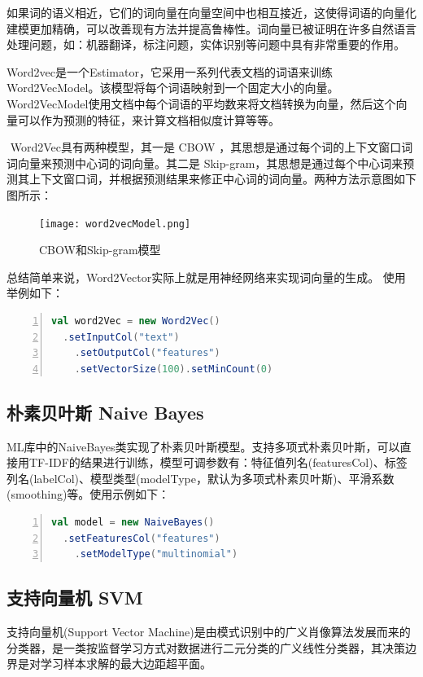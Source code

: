 \documentclass[lang=cn,11pt]{elegantpaper}
\begin{document}
如果词的语义相近，它们的词向量在向量空间中也相互接近，这使得词语的向量化建模更加精确，可以改善现有方法并提高鲁棒性。词向量已被证明在许多自然语言处理问题，如：机器翻译，标注问题，实体识别等问题中具有非常重要的作用。

​ Word2vec是一个Estimator，它采用一系列代表文档的词语来训练Word2VecModel。该模型将每个词语映射到一个固定大小的向量。Word2VecModel使用文档中每个词语的平均数来将文档转换为向量，然后这个向量可以作为预测的特征，来计算文档相似度计算等等。

​ Word2Vec具有两种模型，其一是 CBOW ，其思想是通过每个词的上下文窗口词词向量来预测中心词的词向量。其二是 Skip-gram，其思想是通过每个中心词来预测其上下文窗口词，并根据预测结果来修正中心词的词向量。两种方法示意图如下图所示：
\begin{figure}[H]
	\centering
	\texttt{[image: word2vecModel.png]}
	\caption{CBOW和Skip-gram模型 \label{fig:Word2VecModel}}
\end{figure}
总结简单来说，Word2Vector实际上就是用神经网络来实现词向量的生成。
使用举例如下：
\begin{lstlisting}[language={Scala},numbers=left,numberstyle=\tiny,%frame=shadowbox,  
  rulesepcolor=\color{red!20!green!20!blue!20},  
  keywordstyle=\color{blue!70!black},  
  commentstyle=\color{blue!90!},  
  basicstyle=\ttfamily]  
val word2Vec = new Word2Vec()
  .setInputCol("text")
	.setOutputCol("features")
	.setVectorSize(100).setMinCount(0)
\end{lstlisting}\par

\subsection{朴素贝叶斯 Naive Bayes}
ML库中的NaiveBayes类实现了朴素贝叶斯模型。支持多项式朴素贝叶斯，可以直接用TF-IDF的结果进行训练，模型可调参数有：特征值列名(featuresCol)、标签列名(labelCol)、模型类型(modelType，默认为多项式朴素贝叶斯)、平滑系数(smoothing)等。使用示例如下：
\begin{lstlisting}[language={Scala},numbers=left,numberstyle=\tiny,%frame=shadowbox,  
  rulesepcolor=\color{red!20!green!20!blue!20},  
  keywordstyle=\color{blue!70!black},  
  commentstyle=\color{blue!90!},  
  basicstyle=\ttfamily]  
val model = new NaiveBayes()
  .setFeaturesCol("features")
	.setModelType("multinomial")
\end{lstlisting}

\subsection{支持向量机 SVM}
支持向量机(Support Vector Machine)是由模式识别中的广义肖像算法发展而来的分类器，是一类按监督学习方式对数据进行二元分类的广义线性分类器，其决策边界是对学习样本求解的最大边距超平面。\par
\end{document}
